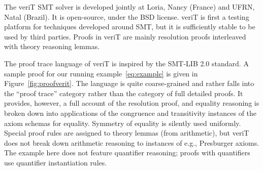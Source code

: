 \documentclass{llncs}
\begin{document}
The veriT SMT solver is developed jointly at Loria, Nancy (France) and UFRN,
Natal (Brazil).  It is open-source, under the BSD license.  veriT is first a
testing platform for techniques developed around SMT, but it is sufficiently
stable to be used by third parties.  Proofs in veriT are mainly resolution
proofs interleaved with theory reasoning lemmas.

The proof trace language of veriT is inspired by the SMT-LIB 2.0 standard.  A
sample proof for our running example~\ref{eq:example} is given in
Figure~\ref{fig:proofverit}.  The language is quite coarse-grained and rather
falls into the ``proof trace'' category rather than the category of full detailed proofs.  It
provides, however, a full account of the resolution proof, and equality reasoning
is broken down into applications of the congruence and transitivity instances of
the axiom schemas for equality.  Symmetry of equality is silently used
uniformly.  Special proof rules are assigned to theory lemmas (from arithmetic),
but veriT does not break down arithmetic reasoning to instances of e.g.,
Presburger axioms.  The example here does not feature quantifier reasoning;
proofs with quantifiers use quantifier instantiation rules.
\end{document}

